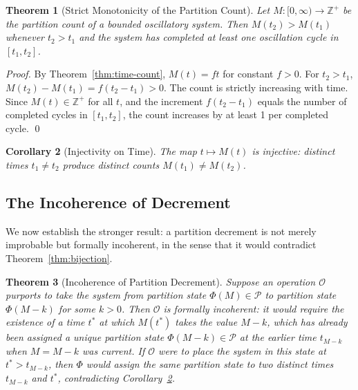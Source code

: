 \documentclass[twocolumn,10pt,a4paper]{article}
\theoremstyle{thmstyle}
\newtheorem{theorem}{Theorem}[section]
\newtheorem{corollary}[theorem]{Corollary}
\theoremstyle{definition}
\theoremstyle{remark}
\newcommand{\Zp}{\mathbb{Z}^{+}}
\newcommand{\Parts}{\mathcal{P}}
\newcommand{\PhiMap}{\varPhi}
\begin{document}
\begin{theorem}[Strict Monotonicity of the Partition Count]
\label{thm:monotone}
Let $M : [0, \infty) \to \Zp$ be the partition count of a bounded oscillatory system. Then $M(t_2) > M(t_1)$ whenever $t_2 > t_1$ and the system has completed at least one oscillation cycle in $[t_1, t_2]$.
\end{theorem}

\begin{proof}
By Theorem~\ref{thm:time-count}, $M(t) = ft$ for constant $f > 0$. For $t_2 > t_1$, $M(t_2) - M(t_1) = f(t_2 - t_1) > 0$. The count is strictly increasing with time. Since $M(t) \in \Zp$ for all $t$, and the increment $f(t_2 - t_1)$ equals the number of completed cycles in $[t_1, t_2]$, the count increases by at least 1 per completed cycle. \qed
\end{proof}

\begin{corollary}[Injectivity on Time]
\label{cor:inject-time}
The map $t \mapsto M(t)$ is injective: distinct times $t_1 \neq t_2$ produce distinct counts $M(t_1) \neq M(t_2)$.
\end{corollary}

\subsection{The Incoherence of Decrement}

We now establish the stronger result: a partition decrement is not merely improbable but formally incoherent, in the sense that it would contradict Theorem~\ref{thm:bijection}.

\begin{theorem}[Incoherence of Partition Decrement]
\label{thm:incoherence}
Suppose an operation $\mathcal{O}$ purports to take the system from partition state $\PhiMap(M) \in \Parts$ to partition state $\PhiMap(M - k)$ for some $k > 0$. Then $\mathcal{O}$ is formally incoherent: it would require the existence of a time $t^*$ at which $M(t^*)$ takes the value $M - k$, which has already been assigned a unique partition state $\PhiMap(M - k) \in \Parts$ at the earlier time $t_{M-k}$ when $M = M - k$ was current. If $\mathcal{O}$ were to place the system in this state at $t^* > t_{M-k}$, then $\PhiMap$ would assign the same partition state to two distinct times $t_{M-k}$ and $t^*$, contradicting Corollary~\ref{cor:inject-time}.
\end{theorem}
\end{document}
